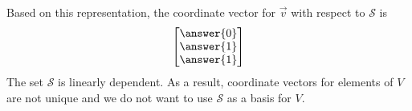 \documentclass{ximera}
\begin{document}
\begin{example}
\begin{explanation}
Based on this representation, the coordinate vector for $\vec{v}$ with respect to $\mathcal{S}$ is
$$\begin{bmatrix}\answer{0}\\\answer{1}\\\answer{1}\end{bmatrix}$$
The set $\mathcal{S}$ is linearly dependent.  As a result, coordinate vectors for elements of $V$ are not unique and we do not want to use $\mathcal{S}$ as a basis for $V$.
\end{explanation}
\end{example}

\end{document}
